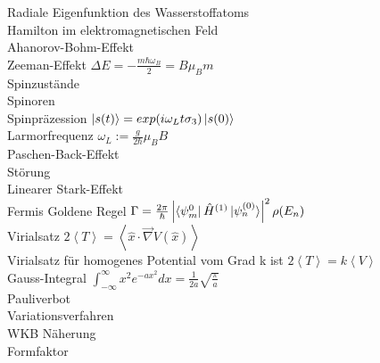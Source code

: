 \documentclass{article}
\begin{document}
Radiale Eigenfunktion des Wasserstoffatoms \\

Hamilton im elektromagnetischen Feld \\

Ahanorov-Bohm-Effekt \\

Zeeman-Effekt $\Delta E = - \frac{m \hbar \omega_B}{2} = B \mu_B m$ \\

Spinzust\"ande \\

Spinoren \\

Spinpr\"azession $\ket{s(t)} = exp(i \omega_L t \sigma_3) \ket{s(0)} $ \\

Larmorfrequenz $\omega_L := \frac{g}{2 \hbar} \mu_B B$ \\

Paschen-Back-Effekt \\

St\"orung \\

Linearer Stark-Effekt \\

Fermis Goldene Regel $\Gamma = \frac{2\pi}{\hbar} \left| \bra{\psi_m^{0}} \hat{H}^{(1)} \ket{\psi_n^{(0)}} \right|^2 \rho(E_n) $\\

Virialsatz $2 \left< T \right> = \left< \hat{x} \cdot \vec{\nabla}V(\hat{x}) \right> $ \\

Virialsatz f\"ur homogenes Potential vom Grad k ist $2 \left< T \right> = k \left< V \right> $ \\

Gauss-Integral $ \int_{-\infty}^{\infty}x^2e^{-ax^2} dx = \frac{1}{2a} \sqrt{\frac{\pi}{a}}$ \\

Pauliverbot \\

Variationsverfahren \\

WKB N\"aherung \\

Formfaktor \\
\end{document}
